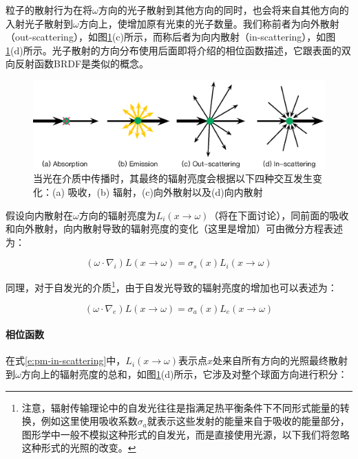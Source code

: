 粒子的散射行为在将${\omega}$方向的光子散射到其他方向的同时，也会将来自其他方向的入射光子散射到${\omega}$方向上，使增加原有光束的光子数量。我们称前者为向外散射（out-scattering），如图\ref{f:pm-medium-properties}(c)所示，而称后者为向内散射（in-scattering），如图\ref{f:pm-medium-properties}(d)所示。光子散射的方向分布使用后面即将介绍的相位函数描述，它跟表面的双向反射函数BRDF是类似的概念。

\begin{figure}
	\includegraphics[width=1.\textwidth]{figures/pm/medium-properties}
	\caption{当光在介质中传播时，其最终的辐射亮度会根据以下四种交互发生变化：(a) 吸收，(b) 辐射，(c)向外散射以及(d)向内散射}
	\label{f:pm-medium-properties}
\end{figure}

假设向内散射在${\omega}$方向的辐射亮度为$L_i(x\to{\omega})$（将在下面讨论），同前面的吸收和向外散射，向内散射导致的辐射亮度的变化（这里是增加）可由微分方程表述为：

\begin{equation}\label{e:pm-in-scattering}
	({\omega}\cdot\nabla_i)L(x\to{\omega})=
	\sigma_s(x)L_i(x\to{\omega})
\end{equation}

同理，对于自发光的介质\footnote{注意，辐射传输理论中的自发光往往是指满足热平衡条件下不同形式能量的转换，例如这里使用吸收系数$\sigma_a$就表示这些发射的能量来自于吸收的能量部分，图形学中一般不模拟这种形式的自发光，而是直接使用光源，以下我们将忽略这种形式的光照的改变。}，由于自发光导致的辐射亮度的增加也可以表述为：

\begin{equation}\label{e:pm-emission}
	({\omega}\cdot\nabla_e)L(x\to{\omega})=
	\sigma_a(x)L_e(x\to{\omega})
\end{equation}




\paragraph{相位函数}
在式\ref{e:pm-in-scattering}中，$L_i(x\to{\omega})$表示点$x$处来自所有方向的光照最终散射到${\omega}$方向上的辐射亮度的总和，如图\ref{f:pm-medium-properties}(d)所示，它涉及对整个球面方向进行积分：

